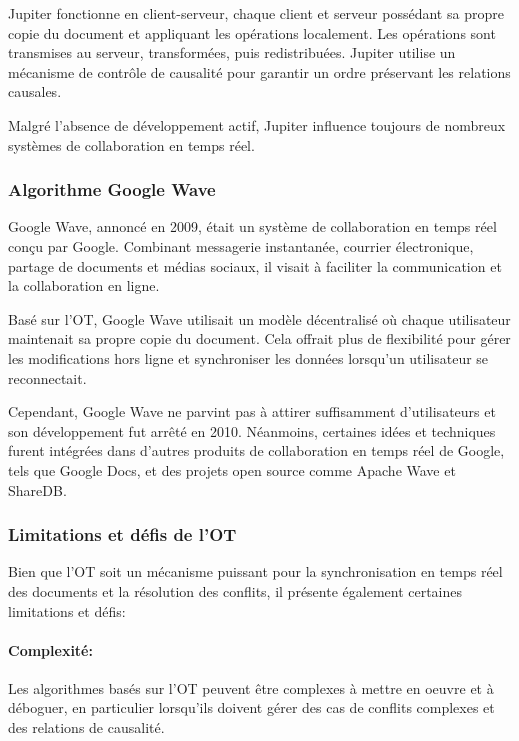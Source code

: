Jupiter fonctionne en client-serveur, chaque client et serveur possédant sa propre copie du document et appliquant les opérations localement. Les opérations sont transmises au serveur, transformées, puis redistribuées. Jupiter utilise un mécanisme de contrôle de causalité pour garantir un ordre préservant les relations causales.

Malgré l'absence de développement actif, Jupiter influence toujours de nombreux systèmes de collaboration en temps réel.

\subsubsection{Algorithme Google Wave}
Google Wave\cite{incIntroducingGoogleWave2009}, annoncé en 2009, était un système de collaboration en temps réel conçu par Google. Combinant messagerie instantanée, courrier électronique, partage de documents et médias sociaux, il visait à faciliter la communication et la collaboration en ligne.

Basé sur l'OT, Google Wave utilisait un modèle décentralisé où chaque utilisateur maintenait sa propre copie du document. Cela offrait plus de flexibilité pour gérer les modifications hors ligne et synchroniser les données lorsqu'un utilisateur se reconnectait.

Cependant, Google Wave ne parvint pas à attirer suffisamment d'utilisateurs et son développement fut arrêté en 2010\cite{holzleOfficialGoogleBlog2010}. Néanmoins, certaines idées et techniques furent intégrées dans d'autres produits de collaboration en temps réel de Google, tels que Google Docs, et des projets open source comme Apache Wave\cite{foundationApacheWave2012} et ShareDB\cite{smithShareDBRealtimeDocument2014}.

\subsubsection{Limitations et défis de l'OT}
Bien que l'OT soit un mécanisme puissant pour la synchronisation en temps réel des documents et la résolution des conflits, il présente également certaines limitations et défis:

\paragraph{Complexité:} Les algorithmes basés sur l'OT peuvent être complexes à mettre en oeuvre et à déboguer, en particulier lorsqu'ils doivent gérer des cas de conflits complexes et des relations de causalité.
